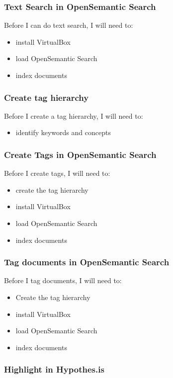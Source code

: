 \documentclass{article}
\begin{document}
\subsubsection*{Text Search in OpenSemantic Search}
Before I can do text search, I will need to:\begin{itemize}
\item install VirtualBox
\item load OpenSemantic Search
\item index documents
\end{itemize}

\subsubsection*{Create tag hierarchy}

Before I create a tag hierarchy, I will need to:
\begin{itemize}
\item identify keywords and concepts
\end{itemize}

\subsubsection*{Create Tags in OpenSemantic Search}

Before I create tags, I will need to:
\begin{itemize}
\item create the tag hierarchy
\item install VirtualBox
\item load OpenSemantic Search
\item index documents
\end{itemize}

\subsubsection*{Tag documents in OpenSemantic Search}

Before I tag documents, I will need to:
\begin{itemize}
\item Create the tag hierarchy
\item install VirtualBox
\item load OpenSemantic Search
\item index documents
\end{itemize}

\subsubsection*{Highlight in Hypothes.is}
\end{document}
